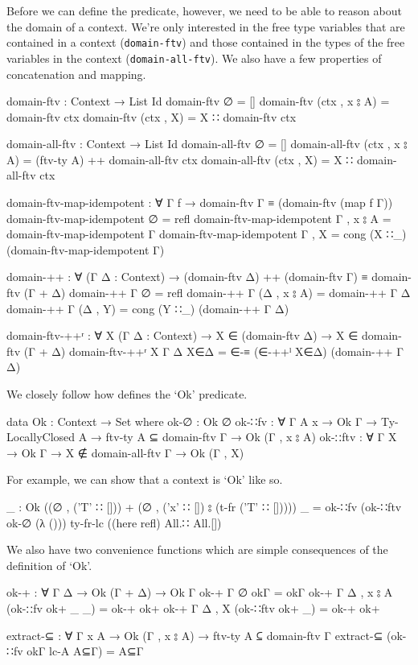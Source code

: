 \documentclass[logo,bsc,singlespacing,parskip,online]{infthesis}
\begin{document}
Before we can define the predicate, however, we need to be able to reason about the domain of a
context. We're only interested in the free type variables that are contained in a context
(\texttt{domain-ftv}) and those contained in the types of the free variables in the context
(\texttt{domain-all-ftv}). We also have a few properties of concatenation and mapping.
\begin{code}
  domain-ftv : Context → List Id
  domain-ftv ∅ = []
  domain-ftv (ctx , x ⦂ A) = domain-ftv ctx
  domain-ftv (ctx , X) = X ∷ domain-ftv ctx

  domain-all-ftv : Context → List Id
  domain-all-ftv ∅ = []
  domain-all-ftv (ctx , x ⦂ A) = (ftv-ty A) ++ domain-all-ftv ctx
  domain-all-ftv (ctx , X) = X ∷ domain-all-ftv ctx

  domain-ftv-map-idempotent : ∀ {Γ f}
    → domain-ftv Γ ≡ (domain-ftv (map f Γ))
  domain-ftv-map-idempotent {∅} = refl
  domain-ftv-map-idempotent {Γ , x ⦂ A} =
    domain-ftv-map-idempotent {Γ}
  domain-ftv-map-idempotent {Γ , X} =
    cong (X ∷_) (domain-ftv-map-idempotent {Γ})

  domain-++ : ∀ (Γ Δ : Context)
    → (domain-ftv Δ) ++ (domain-ftv Γ) ≡ domain-ftv (Γ + Δ)
  domain-++ Γ ∅ = refl
  domain-++ Γ (Δ , x ⦂ A) = domain-++ Γ Δ
  domain-++ Γ (Δ , Y) = cong (Y ∷_) (domain-++ Γ Δ)

  domain-ftv-++ʳ : ∀ {X} (Γ Δ : Context)
    → X ∈ (domain-ftv Δ) → X ∈ domain-ftv (Γ + Δ)
  domain-ftv-++ʳ {X} Γ Δ X∈Δ = ∈-≡ (∈-++ˡ X∈Δ) (domain-++ Γ Δ)
\end{code}

We closely follow how \citet{chargueraud_locally_2012} defines the `Ok' predicate.
\begin{code}
  data Ok : Context → Set where
    ok-∅ : Ok ∅
    ok-∷fv : ∀ {Γ A x} → Ok Γ → Ty-LocallyClosed A
      → ftv-ty A ⊆ domain-ftv Γ → Ok (Γ , x ⦂ A)
    ok-∷ftv : ∀ {Γ X} → Ok Γ → X ∉ domain-all-ftv Γ → Ok (Γ , X)
\end{code}

For example, we can show that a context is `Ok' like so.
\begin{code}
  _ : Ok ((∅ , ('T' ∷ [])) + (∅ , ('x' ∷ []) ⦂ (t-fr ('T' ∷ []))))
  _ = ok-∷fv
    (ok-∷ftv ok-∅ (λ ())) ty-fr-lc ((here refl) All.∷ All.[])
\end{code}

We also have two convenience functions which are simple consequences of the definition of `Ok'.
\begin{code}
  ok-+ : ∀ {Γ Δ} → Ok (Γ + Δ) → Ok Γ
  ok-+ {Γ} {∅} okΓ = okΓ
  ok-+ {Γ} {Δ , x ⦂ A} (ok-∷fv ok+ _ _) = ok-+ ok+
  ok-+ {Γ} {Δ , X} (ok-∷ftv ok+ _) = ok-+ ok+

  extract-⊆ : ∀ {Γ x A} → Ok (Γ , x ⦂ A) → ftv-ty A ⊆ domain-ftv Γ
  extract-⊆ (ok-∷fv okΓ lc-A A⊆Γ) = A⊆Γ
\end{code}
\end{document}
